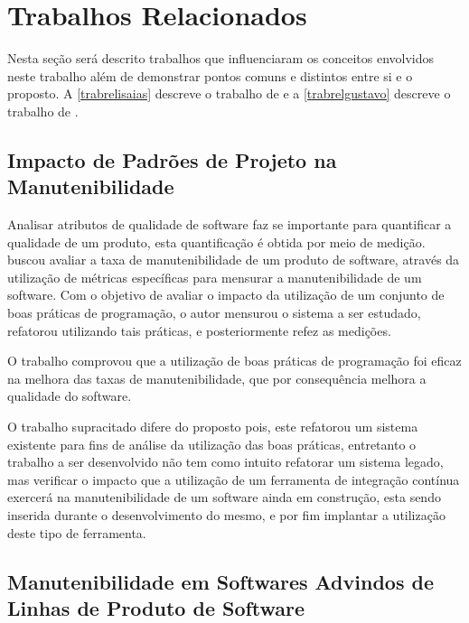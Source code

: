 \chapter{Trabalhos Relacionados}\label{trabalhorel}
Nesta seção será descrito trabalhos que influenciaram os conceitos envolvidos neste trabalho além de demonstrar pontos comuns e distintos entre si e o proposto. A \autoref{trabrelisaias} descreve o trabalho de  e a \autoref{trabrelgustavo} descreve o trabalho de .
\section{Impacto de Padrões de Projeto na Manutenibilidade} \label{trabrelisaias}
Analisar atributos de qualidade de software faz se importante para quantificar a qualidade de um produto, esta quantificação é obtida por meio de medição.  buscou avaliar a taxa de manutenibilidade de um produto de software, através da utilização de métricas específicas para mensurar a manutenibilidade de um software. Com o objetivo de avaliar o impacto da utilização de um conjunto de boas práticas de programação, o autor mensurou o sistema a ser estudado, refatorou utilizando tais práticas, e posteriormente refez as medições.

O trabalho comprovou que a utilização de boas práticas de programação foi eficaz na melhora das taxas de manutenibilidade, que por consequência melhora a qualidade do software.

O trabalho supracitado difere do proposto pois, este refatorou um sistema existente para fins de análise da utilização das boas práticas, entretanto o trabalho a ser desenvolvido não tem como intuito refatorar um sistema legado, mas verificar o impacto que a utilização de um ferramenta de integração contínua exercerá na manutenibilidade de um software ainda em construção, esta sendo inserida durante o desenvolvimento do mesmo, e por fim implantar a utilização deste tipo de ferramenta.


 
\section{Manutenibilidade em Softwares Advindos de Linhas de Produto de Software} \label{trabrelgustavo}
